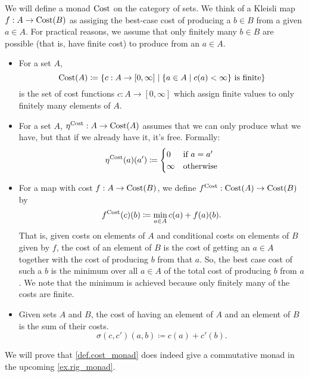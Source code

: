 \documentclass[DynamicalBook]{subfiles}
\begin{document}
\begin{definition}\label{def.cost_monad}
  We will define a monad $\mathrm{Cost}$ on the category of sets. We think of a Kleisli map $f : A \to \mathrm{Cost} ( B )$ as
  assiging the best-case cost of producing a $b \in B$ from a given $a \in A$.
  For practical reasons, we assume that only finitely many $b \in B$ are
  possible (that is, have finite cost) to produce from an $a \in A$.

  \begin{itemize}
  \item For a set $A$,
    \[
\mathrm{Cost}(A) \coloneqq \{c : A \to [0, \infty] \mid \mbox{$\{a \in A \mid c(a) <
  \infty\}$ is finite}\}
    \]
    is the set of cost functions $c : A \to [0, \infty]$ which assign finite
    values to only finitely many elements of $A$.
  \item For a set $A$, $\eta^{\mathrm{Cost}} : A \to \mathrm{Cost}(A)$ assumes that we
    can only produce what we have, but that if we already have it, it's free. Formally:
\[
\eta^{\mathrm{Cost}}(a)(a') \coloneqq \begin{cases} 0 &\mbox{if $a = a'$} \\
  \infty &\mbox{otherwise}\end{cases}
\]

  \item For a map with cost $f : A \to \mathrm{Cost}(B)$, we define
      $f^{\mathrm{Cost}} : \mathrm{Cost}(A) \to \mathrm{Cost}(B)$ by
      \[
f^{\mathrm{Cost}}(c)(b) \coloneqq \min_{a \in A} c(a) + f(a)(b).
      \]
That is, given costs on elements of $A$ and conditional costs on elements of $B$
given by $f$, the cost of an element of $B$ is the cost of getting an $a \in A$
together with the cost of producing $b$ from that $a$. So, the best case cost of
such a $b$ is the minimum over all $a \in A$ of the total cost of producing $b$
from $a$. We note that the minimum is achieved because only finitely many of the
costs are finite.
  \item Given sets $A$ and $B$, the cost of having an element of $A$ and an
    element of $B$ is the sum of their costs.
    $$\sigma(c, c')(a, b) \coloneqq c(a) + c'(b).$$
  \end{itemize}
\end{definition}

\begin{remark}
We will prove that \cref{def.cost_monad} does indeed give a commutative monad in
the upcoming \cref{ex.rig_monad}.
\end{remark}
\end{document}
